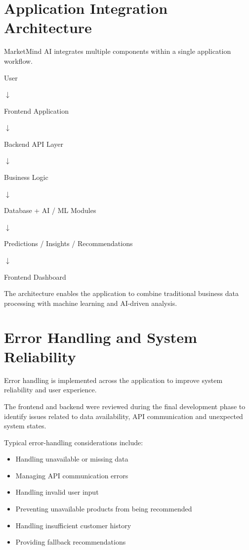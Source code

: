 \documentclass[12pt,a4paper]{report}
\begin{document}

\section{Application Integration Architecture}

MarketMind AI integrates multiple components within a single
application workflow.

\begin{center}

User

$\downarrow$

Frontend Application

$\downarrow$

Backend API Layer

$\downarrow$

Business Logic

$\downarrow$

Database \quad + \quad AI / ML Modules

$\downarrow$

Predictions / Insights / Recommendations

$\downarrow$

Frontend Dashboard

\end{center}

The architecture enables the application to combine traditional
business data processing with machine learning and AI-driven analysis.



\section{Error Handling and System Reliability}

Error handling is implemented across the application to improve system
reliability and user experience.

The frontend and backend were reviewed during the final development
phase to identify issues related to data availability, API
communication and unexpected system states.

Typical error-handling considerations include:

\begin{itemize}
    \item Handling unavailable or missing data
    \item Managing API communication errors
    \item Handling invalid user input
    \item Preventing unavailable products from being recommended
    \item Handling insufficient customer history
    \item Providing fallback recommendations
\end{itemize}
\end{document}
